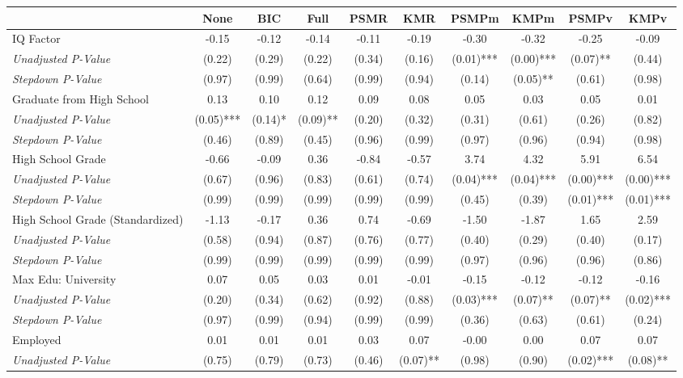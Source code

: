 \begin{tabular}{l c c c c c c c c c}
\toprule
 & None & BIC & Full & PSMR & KMR & PSMPm & KMPm & PSMPv & KMPv \\
\midrule
IQ Factor & -0.15 & -0.12 & -0.14 & -0.11 & -0.19 & -0.30 & -0.32 & -0.25 & -0.09 \\
\quad \textit{Unadjusted P-Value} & (0.22) & (0.29) & (0.22) & (0.34) & (0.16) & (0.01)*** & (0.00)*** & (0.07)** & (0.44) \\
\quad \textit{Stepdown P-Value} & (0.97) & (0.99) & (0.64) & (0.99) & (0.94) & (0.14) & (0.05)** & (0.61) & (0.98) \\
Graduate from High School & 0.13 & 0.10 & 0.12 & 0.09 & 0.08 & 0.05 & 0.03 & 0.05 & 0.01 \\
\quad \textit{Unadjusted P-Value} & (0.05)*** & (0.14)* & (0.09)** & (0.20) & (0.32) & (0.31) & (0.61) & (0.26) & (0.82) \\
\quad \textit{Stepdown P-Value} & (0.46) & (0.89) & (0.45) & (0.96) & (0.99) & (0.97) & (0.96) & (0.94) & (0.98) \\
High School Grade & -0.66 & -0.09 & 0.36 & -0.84 & -0.57 & 3.74 & 4.32 & 5.91 & 6.54 \\
\quad \textit{Unadjusted P-Value} & (0.67) & (0.96) & (0.83) & (0.61) & (0.74) & (0.04)*** & (0.04)*** & (0.00)*** & (0.00)*** \\
\quad \textit{Stepdown P-Value} & (0.99) & (0.99) & (0.99) & (0.99) & (0.99) & (0.45) & (0.39) & (0.01)*** & (0.01)*** \\
High School Grade (Standardized) & -1.13 & -0.17 & 0.36 & 0.74 & -0.69 & -1.50 & -1.87 & 1.65 & 2.59 \\
\quad \textit{Unadjusted P-Value} & (0.58) & (0.94) & (0.87) & (0.76) & (0.77) & (0.40) & (0.29) & (0.40) & (0.17) \\
\quad \textit{Stepdown P-Value} & (0.99) & (0.99) & (0.99) & (0.99) & (0.99) & (0.97) & (0.96) & (0.96) & (0.86) \\
Max Edu: University & 0.07 & 0.05 & 0.03 & 0.01 & -0.01 & -0.15 & -0.12 & -0.12 & -0.16 \\
\quad \textit{Unadjusted P-Value} & (0.20) & (0.34) & (0.62) & (0.92) & (0.88) & (0.03)*** & (0.07)** & (0.07)** & (0.02)*** \\
\quad \textit{Stepdown P-Value} & (0.97) & (0.99) & (0.94) & (0.99) & (0.99) & (0.36) & (0.63) & (0.61) & (0.24) \\
Employed & 0.01 & 0.01 & 0.01 & 0.03 & 0.07 & -0.00 & 0.00 & 0.07 & 0.07 \\
\quad \textit{Unadjusted P-Value} & (0.75) & (0.79) & (0.73) & (0.46) & (0.07)** & (0.98) & (0.90) & (0.02)*** & (0.08)** \\

\end{tabular}
